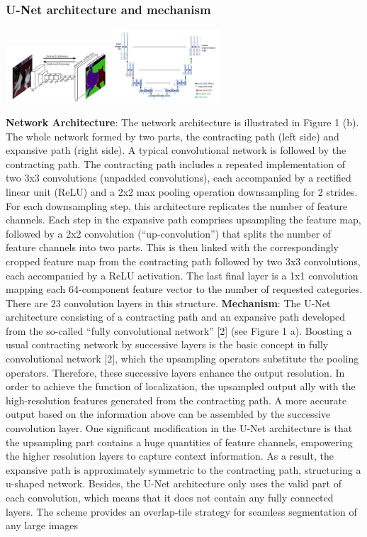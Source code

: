 \documentclass[conference]{IEEEtran}
\begin{document}
\subsubsection{U-Net architecture and mechanism}
\centerline{\includegraphics[width=40mm,scale=0.5]{group/Picture1.png}\includegraphics[width=40mm,scale=0.5]{group/Picture2.png}}
\textbf{Network Architecture}: The network architecture is illustrated in Figure 1 (b). The whole network formed by two parts, the contracting path (left side) and expansive path (right side). A typical convolutional network is followed by the contracting path. The contracting path includes a repeated implementation of two 3x3 convolutions (unpadded convolutions), each accompanied by a rectified linear unit (ReLU) and a 2x2 max pooling operation downsampling for 2 strides. For each downsampling step, this architecture replicates the number of feature channels. Each step in the expansive path comprises upsampling the feature map, followed by a 2x2 convolution (“up-convolution”) that splits the number of feature channels into two parts. This is then linked with the correspondingly cropped feature map from the contracting path followed by two 3x3 convolutions, each accompanied by a ReLU activation. The last final layer is a 1x1 convolution mapping each 64-component feature vector to the number of requested categories. There are 23 convolution layers in this structure.
\textbf{Mechanism}: The U-Net architecture consisting of a contracting path and an expansive path developed from the so-called “fully convolutional network” [2] (see Figure 1 a). Boosting a usual contracting network by successive layers is the basic concept in fully convolutional network [2], which the upsampling operators substitute the pooling operators. Therefore, these successive layers enhance the output resolution. In order to achieve the function of localization, the upsampled output ally with the high-resolution features generated from the contracting path. A more accurate output based on the information above can be assembled by the successive convolution layer.
One significant modification in the U-Net architecture is that the upsampling part contains a huge quantities of feature channels, empowering the higher resolution layers to capture context information. As a result, the expansive path is approximately symmetric to the contracting path, structuring a u-shaped network. Besides, the U-Net architecture only uses the valid part of each convolution, which means that it does not contain any fully connected layers. The scheme provides an overlap-tile strategy for seamless segmentation of any large images
\end{document}
